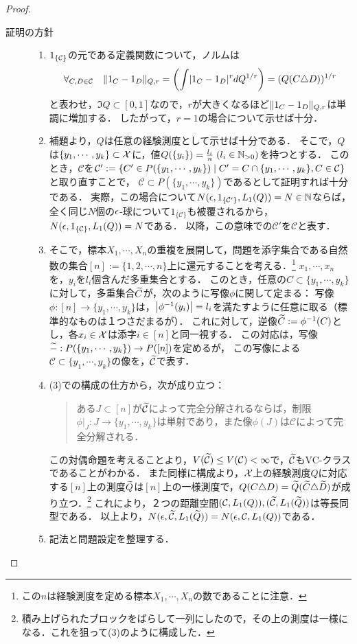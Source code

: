 \documentclass[uplatex,dvipdfmx]{jsreport}
\renewcommand{\C}{\mathcal{C}}
\begin{document}
\begin{proof}\mbox{}
    \begin{description}
        \item[証明の方針] \mbox{}
        \begin{enumerate}
            \item $1_{\{\mathcal{C}\}}$の元である定義関数について，ノルムは
            \[\forall_{C,D\in\C}\quad\norm{1_C-1_D}_{Q,r}=\paren{\int\abs{1_C-1_D}^rdQ^{1/r}}=(Q(C\triangle D))^{1/r}\]
            と表わせ，$\Im Q\subset[0,1]$なので，$r$が大きくなるほど$\|1_C-1_D\|_{Q,r}$は単調に増加する．
            したがって，$r=1$の場合について示せば十分．
            \item 補題より，$Q$は任意の経験測度として示せば十分である．
            そこで，$Q$は$\{y_1,\cdots,y_k\}\subset\mathcal{X}$に，値$Q(\{y_i\})=\frac{l_i}{n}\;(l_i\in\mathbb{N}_{>0})$を持つとする．
            このとき，$\C$を$\C':=\Brace{C'\in P(\{y_1,\cdots,y_k\})\mid C'=C\cap\{y_1,\cdots,y_k\},C\in\C}$と取り直すことで，
            $\C\subset P(\{y_1,\cdots,y_k\})$であるとして証明すれば十分である．
            実際，この場合について$N(\ep,1_{\{\C'\}},L_1(Q))=N\in\N$ならば，
            全く同じ$N$個の$\epsilon$-球について$1_{\{\C\}}$も被覆されるから，$N(\ep,1_{\{\C\}},L_1(Q))=N$である．
            以降，この意味での$\C'$を$\C$と表す．
            \item そこで，標本$X_1,\cdots,X_n$の重複を展開して，問題を添字集合である自然数の集合$[n]:=\{1,2,\cdots,n\}$上に還元することを考える．\footnote{この$n$は経験測度を定める標本$X_1,\cdots,X_n$の数であることに注意．}
            $x_1,\cdots,x_n$を，$y_i$を$l_i$個含んだ多重集合とする．
            このとき，任意の$C\subset\{y_1,\cdots,y_k\}$に対して，多重集合$\widetilde{C}$が，次のように写像$\phi$に関して定まる：
            写像$\phi:[n]\to\{y_1,\cdots,y_k\}$は，$\left|\phi^{-1}(y_i)\right|=l_i$を満たすように任意に取る（標準的なものは１つさだまるが）．
            これに対して，逆像$\widetilde{C}:=\phi^{-1}(C)$とし，各$x_i\in\mathcal{X}$は添字$i\in[n]$と同一視する．
            この対応は，写像$\widetilde{-}:P(\{y_1,\cdots,y_k\})\to P([n])$を定めるが，
            この写像による$\C\subset\{y_1,\cdots,y_k\}$の像を，$\wt{\C}$で表す．
            \item (3)での構成の仕方から，次が成り立つ：
            \begin{quote}
                ある$J\subset[n]$が$\wt{\C}$によって完全分解されるならば，制限$\phi|_J:J\to\{y_1,\cdots,y_k\}$は単射であり，また像$\phi(J)$は$\C$によって完全分解される．
            \end{quote}
            この対偶命題を考えることより，$V(\wt{\C})\le V(\C)<\infty$で，$\wt{\C}$もVC-クラスであることがわかる．
            また同様に構成より，$\mathcal{X}$上の経験測度$Q$に対応する$[n]$上の測度$\widetilde{Q}$は$[n]$上の一様測度で，$Q(C\triangle D)=\widetilde{Q}(\widetilde{C}\triangle\widetilde{D})$が成り立つ．\footnote{積み上げられたブロックをばらして一列にしたので，その上の測度は一様になる．これを狙って(3)のように構成した．}
            これにより，２つの距離空間$(\C,L_1(Q)),(\wt{\C},L_1(\wt{Q}))$は等長同型である．
            以上より，$N(\ep,\wt{\C},L_1(\wt{Q}))=N(\ep,\C,L_1(Q))$である．
            \item 記法と問題設定を整理する．
            

\end{enumerate}
\end{description}
\end{proof}
\end{document}
